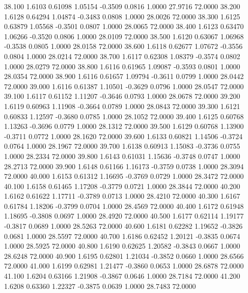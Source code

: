   38.100   1.6103   0.61098   1.05154  -0.3509   0.0816   1.0000  27.9716  72.0000
  38.200   1.6128   0.64294   1.04874  -0.3483   0.0808   1.0000  28.0026  72.0000
  38.300   1.6125   0.63879   1.05568  -0.3501   0.0807   1.0000  28.0065  72.0000
  38.400   1.6123   0.63470   1.06266  -0.3520   0.0806   1.0000  28.0109  72.0000
  38.500   1.6120   0.63067   1.06968  -0.3538   0.0805   1.0000  28.0158  72.0000
  38.600   1.6118   0.62677   1.07672  -0.3556   0.0804   1.0000  28.0214  72.0000
  38.700   1.6117   0.62308   1.08379  -0.3574   0.0802   1.0000  28.0279  72.0000
  38.800   1.6116   0.61965   1.09087  -0.3593   0.0801   1.0000  28.0354  72.0000
  38.900   1.6116   0.61657   1.09794  -0.3611   0.0799   1.0000  28.0442  72.0000
  39.000   1.6116   0.61387   1.10501  -0.3629   0.0796   1.0000  28.0547  72.0000
  39.100   1.6117   0.61152   1.11207  -0.3646   0.0793   1.0000  28.0678  72.0000
  39.200   1.6119   0.60963   1.11908  -0.3664   0.0789   1.0000  28.0843  72.0000
  39.300   1.6121   0.60833   1.12597  -0.3680   0.0785   1.0000  28.1052  72.0000
  39.400   1.6125   0.60768   1.13263  -0.3696   0.0779   1.0000  28.1312  72.0000
  39.500   1.6129   0.60768   1.13900  -0.3711   0.0772   1.0000  28.1620  72.0000
  39.600   1.6133   0.60821   1.14506  -0.3724   0.0764   1.0000  28.1967  72.0000
  39.700   1.6138   0.60913   1.15083  -0.3736   0.0755   1.0000  28.2334  72.0000
  39.800   1.6143   0.61031   1.15636  -0.3748   0.0747   1.0000  28.2713  72.0000
  39.900   1.6148   0.61166   1.16173  -0.3759   0.0738   1.0000  28.3094  72.0000
  40.000   1.6153   0.61312   1.16695  -0.3769   0.0729   1.0000  28.3472  72.0000
  40.100   1.6158   0.61465   1.17208  -0.3779   0.0721   1.0000  28.3844  72.0000
  40.200   1.6162   0.61622   1.17711  -0.3789   0.0713   1.0000  28.4210  72.0000
  40.300   1.6167   0.61784   1.18206  -0.3799   0.0704   1.0000  28.4569  72.0000
  40.400   1.6172   0.61948   1.18695  -0.3808   0.0697   1.0000  28.4920  72.0000
  40.500   1.6177   0.62114   1.19177  -0.3817   0.0689   1.0000  28.5263  72.0000
  40.600   1.6181   0.62282   1.19652  -0.3826   0.0681   1.0000  28.5597  72.0000
  40.700   1.6186   0.62452   1.20121  -0.3835   0.0674   1.0000  28.5925  72.0000
  40.800   1.6190   0.62625   1.20582  -0.3843   0.0667   1.0000  28.6248  72.0000
  40.900   1.6195   0.62801   1.21034  -0.3852   0.0660   1.0000  28.6566  72.0000
  41.000   1.6199   0.62981   1.21477  -0.3860   0.0653   1.0000  28.6878  72.0000
  41.100   1.6204   0.63166   1.21908  -0.3867   0.0646   1.0000  28.7184  72.0000
  41.200   1.6208   0.63360   1.22327  -0.3875   0.0639   1.0000  28.7483  72.0000

